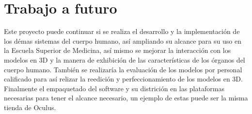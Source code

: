 \section{Trabajo a futuro}
Este proyecto puede continuar si se realiza el desarrollo y la implementaci\'on de los d\'emas sistemas del cuerpo humano, as\'i ampliando su alcance para su uso en la Escuela Superior de Medicina,
as\'i mismo se mejorar la interacci\'on con los modelos en 3D y la manera de exhibici\'on de las caracter\'isticas de los \'organos del cuerpo humano.
Tambi\'en se realizar\'ia la evaluaci\'on de los modelos por personal calificado para as\'i relizar la reedici\'on y perfeccionamiento de los modelos en 3D.
Finalmente el empaquetado del software y su districi\'on en las plataformas necesarias para tener el alcance necesario, un ejemplo de estas puede ser la misma tienda de 
Oculus.

